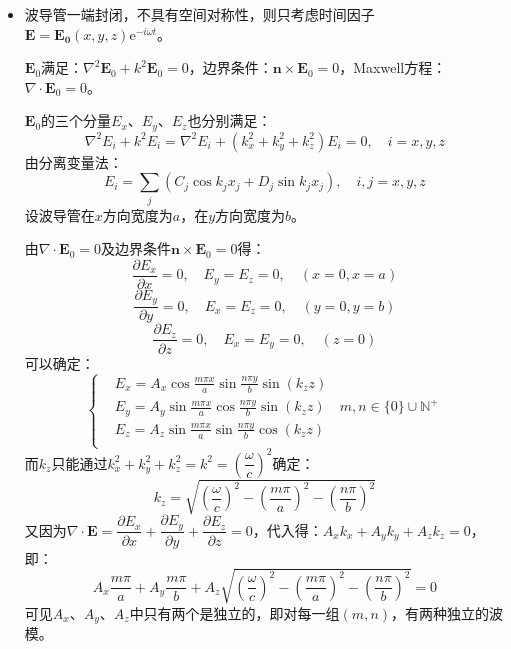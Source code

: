 \documentclass[a4paper,fontset=none]{ctexart}
\begin{document}
\begin{itemize}
    若导电介质为金属：$\dfrac{\sigma}{\omega\varepsilon}\ll1$

    注意到$a_x^2=\dfrac{\omega^2}{c^2}\sin^2\theta_1=\omega^2\mu_0\varepsilon_0\sin^2\theta_1\sim\omega^2\mu\varepsilon$，则$\omega\mu\sigma\gg\omega\mu\varepsilon-\dfrac{\omega^2}{c^2}\sin^2\theta_1$。
    此时有：
    \[
        a_x \ll a_z,\quad a_z \approx b_z \approx \sqrt{\frac{\omega\mu\sigma}{2}}
    \]
    则相速度和透入深度为：
    \[
        v_p = \frac{\omega}{a_z} = \sqrt{\frac{2\omega}{\mu\sigma}},\quad \delta = \frac{1}{b_z} = \sqrt{\frac{2}{\omega\mu\sigma}}
    \]

    \item[9.]
    波导管一端封闭，不具有空间对称性，则只考虑时间因子$\bm{E}=\bm{E_0}(x,y,z)\mathrm{e}^{-i\omega t}$。

    $\bm{E}_0$满足：$\nabla^2\bm{E}_0+k^2\bm{E}_0=0$，边界条件：$\bm{n}\times\bm{E}_0=0$，Maxwell方程：$\nabla\cdot\bm{E}_0=0$。

    $\bm{E}_0$的三个分量$E_x$、$E_y$、$E_z$也分别满足：
    \[
        \nabla^2E_i + k^2E_i = \nabla^2E_i + (k_x^2+k_y^2+k_z^2)E_i = 0,\quad i = x,y,z
    \]
    由分离变量法：
    \[
        E_i = \sum_{j} (C_j\cos k_j x_j + D_j\sin k_j x_j),\quad i,j = x,y,z
    \]
    设波导管在$x$方向宽度为$a$，在$y$方向宽度为$b$。

    由$\nabla\cdot\bm{E}_0=0$及边界条件$\bm{n}\times\bm{E}_0=0$得：
    \[
        \frac{\partial E_x}{\partial x} = 0,\quad E_y = E_z = 0,\quad (x=0,x=a)
    \]
    \[
        \frac{\partial E_y}{\partial y} = 0,\quad E_x = E_z = 0,\quad (y=0,y=b)
    \]
    \[
        \frac{\partial E_z}{\partial z} = 0,\quad E_x = E_y = 0,\quad (z=0)
    \]
    可以确定：
    \[
        \left\{
        \begin{aligned}
            & E_x = A_x\cos\frac{m\pi x}{a}\sin\frac{n\pi y}{b}\sin(k_z z) \\
            & E_y = A_y\sin\frac{m\pi x}{a}\cos\frac{n\pi y}{b}\sin(k_z z)\quad m,n\in\{0\}\cup\mathbb{N}^+ \\
            & E_z = A_z\sin\frac{m\pi x}{a}\sin\frac{n\pi y}{b}\cos(k_z z) \\
        \end{aligned}
        \right.
    \]
    而$k_z$只能通过$k_x^2+k_y^2+k_z^2=k^2=\left(\dfrac{\omega}{c}\right)^2$确定：
    \[
        k_z=\sqrt{\left(\frac{\omega}{c}\right)^2-\left(\frac{m\pi}{a}\right)^2-\left(\frac{n\pi}{b}\right)^2}
    \]
    又因为$\nabla\cdot\bm{E}=\dfrac{\partial E_x}{\partial x}+\dfrac{\partial E_y}{\partial y}+\dfrac{\partial E_z}{\partial z}=0$，代入得：$A_x k_x+A_y k_y + A_z k_z=0$，即：
    \[
        A_x\frac{m\pi}{a} + A_y\frac{m\pi}{b} + A_z\sqrt{\left(\dfrac{\omega}{c}\right)^2-\left(\dfrac{m\pi}{a}\right)^2-\left(\dfrac{n\pi}{b}\right)^2} = 0
    \]
    可见$A_x$、$A_y$、$A_z$中只有两个是独立的，即对每一组$(m,n)$，有两种独立的波模。


\end{itemize}
\end{document}
